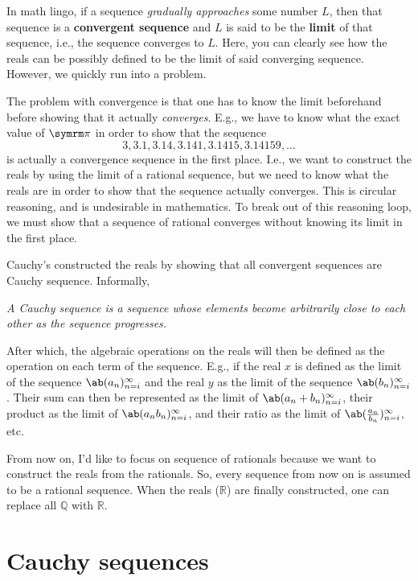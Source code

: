In math lingo, if a sequence \emph{gradually approaches} some number $L$, then that sequence is a
\textbf{convergent sequence} and $L$ is said to be the \textbf{limit} of that sequence, i.e., the
sequence converges to $L$. Here, you can clearly see how the reals can be possibly defined to
be the limit of said converging sequence. However, we quickly run into a problem.

The problem with convergence is that one has to know the limit beforehand before
showing that it actually \emph{converges}. E.g., we have to know what the exact
value of $\cpi$ in order to show that the sequence
\begin{equation*}
  3, 3.1, 3.14, 3.141, 3.1415, 3.14159, \dots
\end{equation*}
is actually a convergence sequence in the first place. I.e., we want to construct the
reals by using the limit of a rational sequence, but we need to know what the reals are
in order to show that the sequence actually converges. This is circular reasoning, and
is undesirable in mathematics. To break out of this reasoning loop, we must show that
a sequence of rational converges without knowing its limit in the first place.

Cauchy's constructed the reals by showing that all convergent sequences are Cauchy
sequence. Informally,
\begin{displayquote}
  \emph{A Cauchy sequence is a sequence whose elements become arbitrarily close to each
  other as the sequence progresses.}
\end{displayquote}
After which, the algebraic operations on the reals will then be defined as the
operation on each term of the sequence. E.g., if the real $x$ is defined as the
limit of the sequence $\sequence{a_n}{n = i}{\infty}$ and the real $y$ as the limit
of the sequence $\sequence{b_n}{n = i}{\infty}$. Their sum can then be represented
as the limit of $\sequence{a_n + b_n}{n = i}{\infty}$, their product as the limit of
$\sequence{a_n b_n}{n = i}{\infty}$, and their ratio as the limit of
$\sequence{\frac{a_n}{b_n}}{n = i}{\infty}$, etc.

From now on, I'd like to focus on sequence of rationals because we want to construct the reals
from the rationals. So, every sequence from now on is assumed to be a rational sequence. When the
reals ($\mathbb{R}$) are finally constructed, one can replace all $\mathbb{Q}$ with $\mathbb{R}$.

\section{Cauchy sequences}

